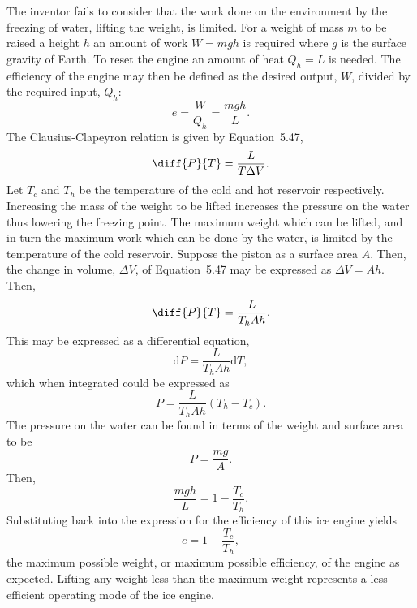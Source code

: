 \documentclass[a4paper, 12pt]{config/homework}
\begin{document}
\bigskip\noindent
The inventor fails to consider that the work done on the environment by the freezing of water, lifting the weight, is limited. For a weight of mass \(m\) to be raised a height \(h\) an amount of work \(W=mgh\) is required where \(g\) is the surface gravity of Earth. To reset the engine an amount of heat \(Q_h=L\) is needed. The efficiency of the engine may then be defined as the desired output, \(W\), divided by the required input, \(Q_h\):
\[e = \frac{W}{Q_h} = \frac{mgh}{L}.\]
The Clausius-Clapeyron relation is given by Equation~5.47,
\[\diff{P}{T} = \frac{L}{T\Delta V}.\]
Let \(T_c\) and \(T_h\) be the temperature of the cold and hot reservoir respectively. Increasing the mass of the weight to be lifted increases the pressure on the water thus lowering the freezing point. The maximum weight which can be lifted, and in turn the maximum work which can be done by the water, is limited by the temperature of the cold reservoir. Suppose the piston as a surface area \(A\). Then, the change in volume, \(\Delta V\), of Equation~5.47 may be expressed as \(\Delta V = Ah\). Then,
\[\diff{P}{T} = \frac{L}{T_h A h}.\]
This may be expressed as a differential equation,
\[\text{d}P = \frac{L}{T_h A h} \text{d}T,\]
which when integrated could be expressed as
\[P = \frac{L}{T_h A h} \left(T_h - T_c\right).\]
The pressure on the water can be found in terms of the weight and surface area to be
\[P = \frac{mg}{A}.\]
Then,
\[\frac{mgh}{L} = 1 - \frac{T_c}{T_h}.\]
Substituting back into the expression for the efficiency of this ice engine yields
\[e = 1 - \frac{T_c}{T_h},\]
the maximum possible weight, or maximum possible efficiency, of the engine as expected. Lifting any weight less than the maximum weight represents a less efficient operating mode of the ice engine.
\end{document}

